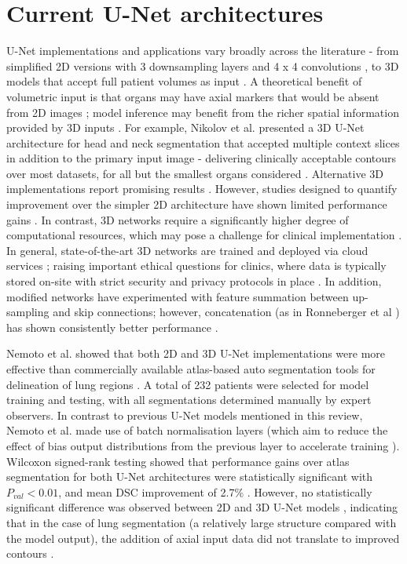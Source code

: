 \section{Current U-Net architectures}
U-Net implementations and applications vary broadly across the literature - from simplified 2D versions with 3 downsampling layers and 4 x 4 convolutions \cite{Nemoto_2020}, to 3D models that accept full patient volumes as input \cite{Zhu_2018}. A theoretical benefit of volumetric input is that organs may have axial markers that would be absent from 2D images \cite{Hesamian2019}; model inference may benefit from the richer spatial information provided by 3D inputs \cite{Nemoto_2020}. For example, Nikolov et al. presented a 3D U-Net architecture for head and neck segmentation that accepted multiple context slices in addition to the primary input image \cite{Nikolov_2018} - delivering clinically acceptable contours over most datasets, for all but the smallest organs considered \cite{Nikolov_2018}. Alternative 3D implementations report promising results \cite{ Nikolov_2018, Zhu_2018, _i_ek_2016}. However, studies designed to quantify improvement over the simpler 2D architecture have shown limited performance gains \cite{Nemoto_2020}. In contrast, 3D networks require a significantly higher degree of computational resources, which may pose a challenge for clinical implementation \cite{Nemoto_2020}. In general, state-of-the-art 3D networks are trained and deployed via cloud services \cite{Nemoto_2020}; raising important ethical questions for clinics, where data is typically stored on-site with strict security and privacy protocols in place \cite{Nemoto_2020, Lundervold2019}. In addition, modified networks have experimented with feature summation between up-sampling and skip connections; however, concatenation (as in Ronneberger et al \cite{Ronneberger_2015}) has shown consistently better performance \cite{Zhu_2018}.

Nemoto et al. showed that both 2D and 3D U-Net implementations were more effective than commercially available atlas-based auto segmentation tools for delineation of lung regions  \cite{Nemoto_2020}. A total of 232 patients were selected for model training and testing, with all segmentations determined manually by expert observers. In contrast to previous U-Net models mentioned in this review, Nemoto et al. made use of batch normalisation layers (which aim to reduce the effect of bias output distributions from the previous layer to accelerate training \cite{santurkar2018}). Wilcoxon signed-rank testing showed that performance gains over atlas segmentation for both U-Net architectures were statistically significant with $P_{val}<0.01$, and mean DSC improvement of 2.7\% \cite{Nemoto_2020}. However, no statistically significant difference was observed between 2D and 3D U-Net models \cite{Nemoto_2020}, indicating that in the case of lung segmentation (a relatively large structure compared with the model output), the addition of axial input data did not translate to improved contours \cite{Nemoto_2020}.
%
%
